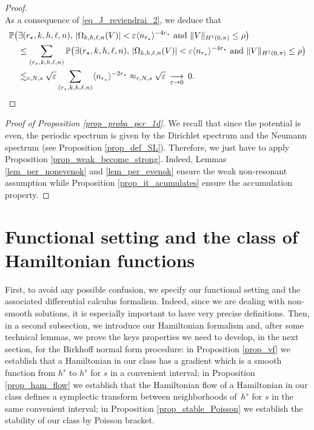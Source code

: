 \begin{proof}
\[\]
As a consequence of \eqref{eq_J_reviendrai_2}, we deduce that
\begin{align*}
\mathbb{P}\big(&\exists (r_\star,k,h,\ell,n), \, |\Omega_{k,h,\ell,n}(V)| < \varepsilon \langle n_{r_\star} \rangle^{-4 r_\star} \ \text{and} \ \| V\|_{H^1(0,\pi)} \leq \rho \big) \\ & \leq \sum_{ (r_\star,k,h,\ell,n)} \mathbb{P}\big(\exists (r_\star,k,h,\ell,n), \, |\Omega_{k,h,\ell,n}(V)| < \varepsilon \langle n_{r_\star} \rangle^{-4 r_\star} \ \text{and} \ \| V\|_{H^1(0,\pi)} \leq \rho \big) \\
& \lesssim_{r,N,s} \sqrt{\varepsilon} \sum_{ (r_\star,k,h,\ell,n)} \langle n_{r_\star} \rangle^{-2 r_\star} \approx_{r,N,s} \sqrt{\varepsilon} \ \mathop{\longrightarrow}_{\varepsilon \to 0} \ 0.\qedhere
\end{align*}
\end{proof}

\begin{proof}[Proof of Proposition \ref{prop_proba_per_1d}] We recall that since the potential is even, the periodic spectrum is given by the Dirichlet spectrum and the Neumann spectrum (see Proposition \ref{prop_def_SL}). Therefore, we just have to apply Proposition \ref{prop_weak_become_strong}. Indeed, Lemmas \ref{lem_per_nonevenok} and \ref{lem_per_evenok} ensure the weak non-resonant assumption while Proposition \ref{prop_it_acumulates} ensure the accumulation property.
\end{proof}

\section{Functional setting and the class of Hamiltonian functions}
\label{sec_class_Ham}

First, to avoid any possible confusion, we specify our functional setting and the asso\-ciated differential calculus formalism. Indeed, since we are dealing with non-smooth solutions, it is especially important to have very precise definitions. Then, in a second subsection, we introduce our Hamiltonian formalism and, after some technical lemmas, we prove the keys properties we need to develop, in the next section, for the Birkhoff normal form procedure: in Proposition \ref{prop_vf} we establish that a Hamiltonian in our class has a gradient which is a smooth function from $h^s$ to $h^s$ for $s$ in a convenient interval; in Proposition \ref{prop_ham_flow} we establish that the Hamiltonian flow of a Hamiltonian in our class defines a symplectic transform between neighborhoods of~$h^s$ for $s$ in the same convenient interval; in Proposition \ref{prop_stable_Poisson} we establish the stability of our class by Poisson bracket.

